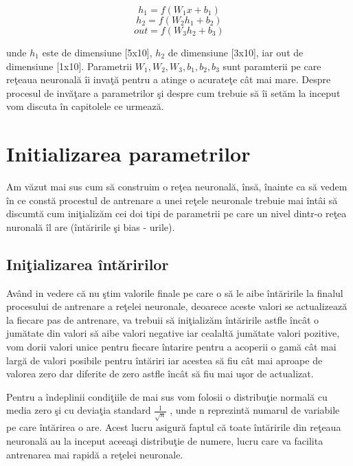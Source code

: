 $$h_1 = f( W_1 x + b_1 ) $$
$$h_2 = f( W_2 h_1 + b_2 ) $$
$$out = f( W_3 h_2 + b_3 ) $$

unde $h_1$ este de dimensiune [5x10], $h_2$ de dimensiune [3x10], iar out de dimensiune [1x10]. Parametrii $W_1, W_2, W_3, b_1, b_2, b_3$ sunt paramterii pe care re\c{t}eaua neuronal\u{a} \^{i}i inva\c{t}\u{a} pentru a atinge o acurate\c{t}e c\^{a}t mai mare. Despre procesul de inv\u{a}\c{t}are a parametrilor \c{s}i despre cum trebuie s\u{a} \^{i}i set\u{a}m la inceput vom discuta \^{i}n capitolele ce urmeaz\u{a}.

\section{Initializarea parametrilor}

Am v\u{a}zut mai sus cum s\u{a} construim o re\c{t}ea neuronal\u{a}, \^{i}ns\u{a}, \^{i}nainte ca s\u{a} vedem \^{i}n ce const\u{a} procestul de antrenare  a unei re\c{t}ele neuronale trebuie mai \^{i}nt\^{a}i s\u{a} discumt\u{a} cum ini\c{t}ializ\u{a}m cei doi tipi de parametrii pe care un nivel dintr-o re\c{t}ea nuronal\u{a} \^{i}l are (\^{i}nt\u{a}ririle \c{s}i bias - urile). 

\subsection{Ini\c{t}ializarea \^{i}nt\u{a}ririlor}

Av\^{a}nd in vedere c\u{a} nu \c{s}tim valorile finale pe care o s\u{a} le aibe \^{i}nt\u{a}ririle la finalul procesului de antrenare a re\c{t}elei neuronale, deoarece aceste valori se actualizeaz\u{a} la fiecare pas de antrenare, va trebuii s\u{a} ini\c{t}ializ\u{a}m \^{i}nt\u{a}ririle astfle \^{i}nc\^{a}t o jum\u{a}tate din valori s\u{a} aibe valori negative iar cealalt\u{a} jum\u{a}tate valori pozitive, vom dorii valori unice pentru fiecare \^{i}ntarire pentru a acoperii o gam\u{a} c\^{a}t mai larg\u{a} de valori posibile pentru \^{i}nt\u{a}riri iar acestea s\u{a} fiu c\^{a}t mai aproape de valorea zero dar diferite de zero astfle \^{i}nc\^{a}t s\u{a} fiu mai u\c{s}or de actualizat.

\par

Pentru a \^{i}ndeplinii condi\c{t}iile de mai sus vom folosii o distribu\c{t}ie normal\u{a} cu media zero \c{s}i cu devia\c{t}ia standard $\frac{1}{\sqrt{n}}$ , unde n reprezint\u{a} numarul de variabile pe care \^{i}nt\u{a}rirea o are. Acest lucru asigur\u{a} faptul c\u{a} toate \^{i}nt\u{a}ririle din re\c{t}eaua neuronal\u{a} au la inceput aceea\c{s}i distribu\c{t}ie de numere, lucru care va facilita antrenarea mai rapid\u{a} a re\c{t}elei neuronale.

